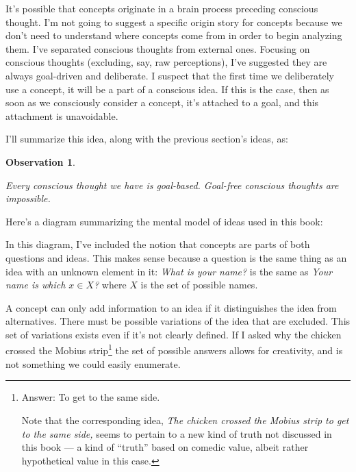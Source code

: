 \documentclass[9pt, twoside]{book}
\newtheorem{obs}{Observation}
\theoremstyle{argtstyle}
\begin{document}
It's possible that concepts originate in a brain process preceding conscious
thought.
I'm not going to suggest a specific origin story for concepts
because we don't need to understand where concepts come from
in order to begin analyzing them.
I've separated conscious thoughts from external ones.
Focusing on conscious thoughts (excluding, say, raw perceptions),
I've suggested they are always goal-driven and deliberate.
I suspect that
the first time we deliberately use a concept, it will be a
part of a conscious idea.
If this is the case, then
as soon as we consciously consider a concept, it's attached
to a goal, and this attachment is unavoidable.


I'll summarize this idea, along with the previous section's ideas, as:
\newcommand{\obsfour}{
    Every conscious thought we have is goal-based.
    Goal-free conscious %
    thoughts are impossible.
}
\begin{obs}\label{o4}
    \obsfour
\end{obs}

Here's a diagram summarizing the mental model of ideas used in this
book:

\begin{center}
%
\end{center}

In this diagram, I've included the notion that concepts are parts of both
questions and ideas.
This makes sense because a question is the same thing as an idea
with an unknown element in it: {\em What is your name?} is the same as
{\em Your name is which $x\in X$?} where $X$ is the set of possible names.

A concept can only add information to an idea if it distinguishes the idea
from alternatives.
There must be possible variations of the idea that are excluded.
This set of variations exists even if it's not clearly defined.
If I asked why the chicken crossed the Mobius strip\footnote{Answer: To
get to the same side.\par Note that the corresponding idea, {\em The chicken
crossed the Mobius strip to get to the same side,} seems to pertain to a new
kind of truth not discussed in this book ---
a kind of ``truth'' based on comedic
value, albeit rather hypothetical value in this case.}
the set of possible answers allows for creativity, and is not something we could
easily enumerate.
\end{document}
